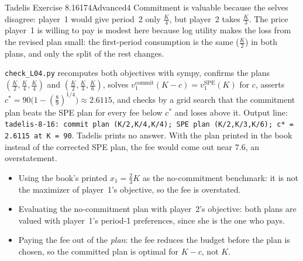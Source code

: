 \begin{exsol}{Tadelis Exercise 8.16}{174}{Advanced}{4}
\interp Commitment is valuable because the selves disagree: player~1 would give period~2 only $\frac K4$,
but player~2 takes $\frac K3$. The price player~1 is willing to pay is modest here because log utility makes the
loss from the revised plan small: the first-period consumption is the same ($\frac K2$) in both plans, and only
the split of the rest changes.

\verify \texttt{check\_L04.py} recomputes both objectives with sympy, confirms the plans
$(\frac K2, \frac K4, \frac K4)$ and $(\frac K2, \frac K3, \frac K6)$, solves $v_1^{\text{commit}}(K - c) =
v_1^{\text{SPE}}(K)$ for $c$, asserts $c^* = 90\bigl(1 - (\frac89)^{1/4}\bigr) \approx 2.6115$, and checks by a grid
search that the commitment plan beats the SPE plan for every fee below $c^*$ and loses above it. Output line:
\texttt{tadelis-8-16: commit plan (K/2,K/4,K/4); SPE plan (K/2,K/3,K/6); c* = 2.6115 at K = 90}. Tadelis prints
no answer. With the plan printed in the book instead of the corrected SPE plan, the fee would come out near
$7.6$, an overstatement.

\mistakes
\begin{itemize}
  \item Using the book's printed $x_1 = \frac23K$ as the no-commitment benchmark: it is not the maximizer of
  player~1's objective, so the fee is overstated.
  \item Evaluating the no-commitment plan with player~2's objective: both plans are valued with player~1's
  period-1 preferences, since she is the one who pays.
  \item Paying the fee out of the \emph{plan}: the fee reduces the budget before the plan is chosen, so the
  committed plan is optimal for $K - c$, not $K$.
\end{itemize}

\end{exsol}
